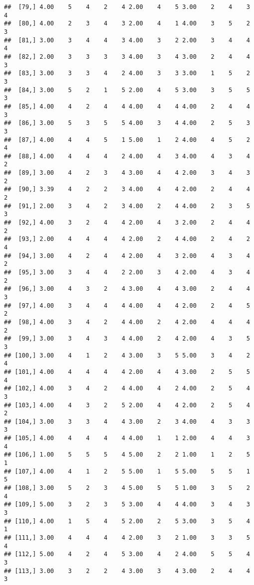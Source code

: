 \documentclass[]{article}
\begin{document}
\begin{verbatim}
##  [79,] 4.00    5    4    2    4 2.00    4    5 3.00    2    4    3    4
##  [80,] 4.00    2    3    4    3 2.00    4    1 4.00    3    5    2    3
##  [81,] 3.00    3    4    4    3 4.00    3    2 2.00    3    4    4    4
##  [82,] 2.00    3    3    3    3 4.00    3    4 3.00    2    4    4    3
##  [83,] 3.00    3    3    4    2 4.00    3    3 3.00    1    5    2    3
##  [84,] 3.00    5    2    1    5 2.00    4    5 3.00    3    5    5    3
##  [85,] 4.00    4    2    4    4 4.00    4    4 4.00    2    4    4    3
##  [86,] 3.00    5    3    5    5 4.00    3    4 4.00    2    5    3    3
##  [87,] 4.00    4    4    5    1 5.00    1    2 4.00    4    5    2    4
##  [88,] 4.00    4    4    4    2 4.00    4    3 4.00    4    3    4    2
##  [89,] 3.00    4    2    3    4 3.00    4    4 2.00    3    4    3    2
##  [90,] 3.39    4    2    2    3 4.00    4    4 2.00    2    4    4    2
##  [91,] 2.00    3    4    2    3 4.00    2    4 4.00    2    3    5    3
##  [92,] 4.00    3    2    4    4 2.00    4    3 2.00    2    4    4    2
##  [93,] 2.00    4    4    4    4 2.00    2    4 4.00    2    4    2    4
##  [94,] 3.00    4    2    4    4 2.00    4    3 2.00    4    3    4    2
##  [95,] 3.00    3    4    4    2 2.00    3    4 2.00    4    3    4    2
##  [96,] 3.00    4    3    2    4 3.00    4    4 3.00    2    4    4    3
##  [97,] 4.00    3    4    4    4 4.00    4    4 2.00    2    4    5    2
##  [98,] 4.00    3    4    2    4 4.00    2    4 2.00    4    4    4    2
##  [99,] 3.00    3    4    3    4 4.00    2    4 2.00    4    3    5    3
## [100,] 3.00    4    1    2    4 3.00    3    5 5.00    3    4    2    4
## [101,] 4.00    4    4    4    4 2.00    4    4 3.00    2    5    5    4
## [102,] 4.00    3    4    2    4 4.00    4    2 4.00    2    5    4    3
## [103,] 4.00    4    3    2    5 2.00    4    4 2.00    2    5    4    2
## [104,] 3.00    3    3    4    4 3.00    2    3 4.00    4    3    3    3
## [105,] 4.00    4    4    4    4 4.00    1    1 2.00    4    4    3    4
## [106,] 1.00    5    5    5    4 5.00    2    2 1.00    1    2    5    1
## [107,] 4.00    4    1    2    5 5.00    1    5 5.00    5    5    1    5
## [108,] 3.00    5    2    3    4 5.00    5    5 1.00    3    5    2    4
## [109,] 5.00    3    2    3    5 3.00    4    4 4.00    3    4    3    3
## [110,] 4.00    1    5    4    5 2.00    2    5 3.00    3    5    4    1
## [111,] 3.00    4    4    4    4 2.00    3    2 1.00    3    3    5    4
## [112,] 5.00    4    2    4    5 3.00    4    2 4.00    5    5    4    3
## [113,] 3.00    3    2    2    4 3.00    3    4 3.00    2    4    4    3

\end{verbatim}
\end{document}
